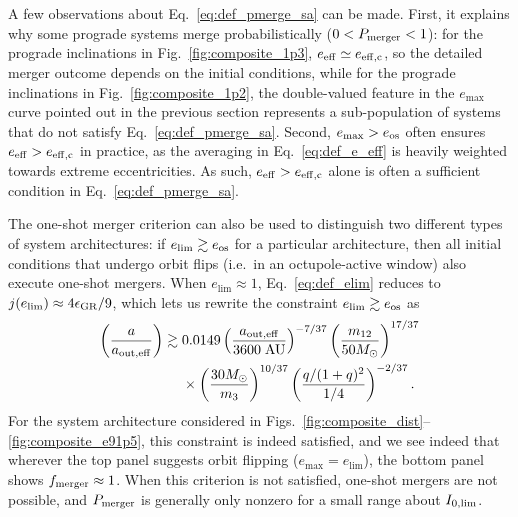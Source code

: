 \documentclass[
        fleqn,
        usenatbib,
    ]{mnras}
\newcommand*{\p}[1]{\left(#1\right)}
\begin{document}
A few observations about Eq.~\eqref{eq:def_pmerge_sa} can be made. First, it
explains why some prograde systems merge probabilistically ($0 < P_{\rm merger}
< 1$): for the prograde inclinations in Fig.~\ref{fig:composite_1p3}, $e_{\rm
eff} \simeq e_{\rm eff, c}$, so the detailed merger outcome depends on the
initial conditions, while for the prograde inclinations in
Fig.~\ref{fig:composite_1p2}, the double-valued feature in the $e_{\max}$ curve
pointed out in the previous section represents a sub-population of systems that
do not satisfy Eq.~\eqref{eq:def_pmerge_sa}. Second, $e_{\max} > e_{\rm os}$
often ensures $e_{\rm eff} > e_{\rm eff, c}$ in practice, as the averaging in
Eq.~\eqref{eq:def_e_eff} is heavily weighted towards extreme eccentricities. As
such, $e_{\rm eff} > e_{\rm eff, c}$ alone is often a sufficient condition in
Eq.~\eqref{eq:def_pmerge_sa}.

The one-shot merger criterion can also be used to distinguish two different
types of system architectures: if $e_{\lim} \gtrsim e_{\rm os}$ for a particular
architecture, then all initial conditions that undergo orbit flips (i.e.\ in an
octupole-active window) also execute one-shot mergers. When $e_{\lim} \approx
1$, Eq.~\eqref{eq:def_elim} reduces to $j(e_{\lim}) \approx 4\epsilon_{\rm GR} /
9$, which lets us rewrite the constraint $e_{\lim} \gtrsim e_{\rm os}$ as
\begin{align}
    \p{\frac{a}{a_{\rm out, eff}}} \gtrsim{}&
        0.0149
        \p{\frac{a_{\rm out, eff}}{3600\;\mathrm{AU}}}^{-7/37}
        \p{\frac{m_{12}}{50M_{\odot}}}^{17/37}\nonumber\\
        &\times\p{\frac{30M_{\odot}}{m_3}}^{10/37}
        \p{\frac{q / (1 + q)^2}{1/4}}^{-2/37}.\label{eq:q_237}
\end{align}
For the system architecture considered in
Figs.~\ref{fig:composite_dist}--\ref{fig:composite_e91p5}, this constraint is
indeed satisfied, and we see indeed that wherever the top panel suggests orbit
flipping ($e_{\max} = e_{\lim}$), the bottom panel shows $f_{\rm merger} \approx
1$. When this criterion is not satisfied, one-shot mergers are not
possible, and $P_{\rm merger}$ is generally only nonzero for a small range about
$I_{\rm 0, \lim}$.
\end{document}
